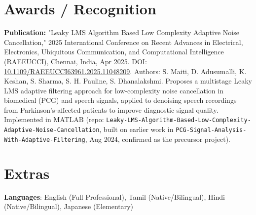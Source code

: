 \documentclass[letterpaper,11pt]{article}
\begin{document}
\section{Awards / Recognition}
 \begin{itemize}[leftmargin=0.15in, label={}]
    \small{
      \item{\textbf{Publication:} "Leaky LMS Algorithm Based Low Complexity Adaptive Noise Cancellation," 2025 International Conference on Recent Advances in Electrical, Electronics, Ubiquitous Communication, and Computational Intelligence (RAEEUCCI), Chennai, India, Apr 2025. DOI: \href{https://doi.org/10.1109/RAEEUCCI63961.2025.11048209}{10.1109/RAEEUCCI63961.2025.11048209}. Authors: S. Maiti, D. Adusumalli, K. Keshan, S. Sharma, S. H. Pauline, S. Dhanalakshmi. Proposes a multistage Leaky LMS adaptive filtering approach for low-complexity noise cancellation in biomedical (PCG) and speech signals, applied to denoising speech recordings from Parkinson's-affected patients to improve diagnostic signal quality. Implemented in MATLAB (repo: \texttt{Leaky-LMS-Algorithm-Based-Low-Complexity-Adaptive-Noise-Cancellation}, built on earlier work in \texttt{PCG-Signal-Analysis-With-Adaptive-Filtering}, Aug 2024, confirmed as the precursor project).}
    }
 \end{itemize}


\section{Extras}
 \begin{itemize}[leftmargin=0.15in, label={}]
    \small{\item{
     \textbf{Languages}{: English (Full Professional), Tamil (Native/Bilingual), Hindi (Native/Bilingual), Japanese (Elementary)}
    }}
 \end{itemize}


\end{document}
